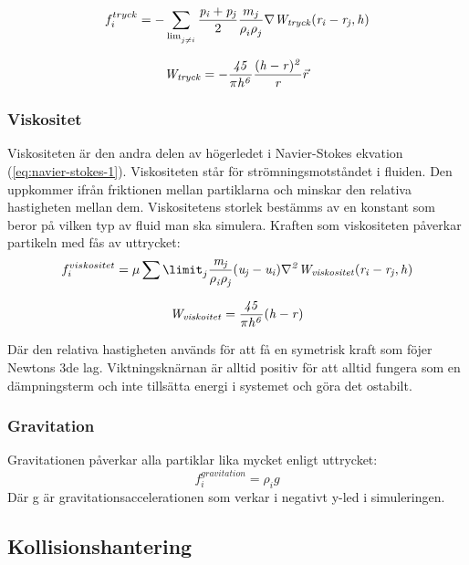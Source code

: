 \documentclass[a4paper,12pt,oneside,final]{extarticle}
\begin{document}
\begin{equation} \label{eq:f_tryck}
f^{tryck}_i = - \sum_{\lim^{}_{j \neq i}} \frac{\it p_i + p_j}{2} \frac{m_j}{\rho^{}_{i} \rho^{}_{j}} \nabla {\it W_{tryck} (r_i - r_j,h)}
\end{equation}

\begin{equation} \label{eq:w_tryck}
{\it W_{tryck} = -\frac{45}{\pi h^6}\frac{(h-r)^2}{r}} \vec{r}
\end{equation}

\subsubsection{Viskositet}
Viskositeten är den andra delen av högerledet i Navier-Stokes ekvation (\ref{eq:navier-stokes-1}).
Viskositeten står för strömningsmotståndet i fluiden.
Den uppkommer ifrån friktionen mellan partiklarna och minskar den relativa hastigheten mellan dem.
Viskositetens storlek bestämms av en konstant som beror på vilken typ av fluid man ska simulera.
Kraften som viskositeten påverkar partikeln med fås av uttrycket:
\begin{equation}
f^{viskositet}_i = \mu \sum \limit^{}_{j} {\it \frac{m_j}{\rho^{}_{i} \rho^{}_{j}} (u_j - u_i) \nabla^{2}_{} W_{viskositet} (r_i - r_j,h)}
\end{equation}

\begin{equation}
{\it W_{viskoitet} = \frac{45}{\pi h^6} {(h-r)}}
\end{equation}

Där den relativa hastigheten används för att få en symetrisk kraft som föjer Newtons 3de lag. Viktningsknärnan är alltid positiv för att alltid fungera som en dämpningsterm och inte tillsätta energi i systemet och göra det ostabilt. 

\subsubsection{Gravitation}
Gravitationen påverkar alla partiklar lika mycket enligt uttrycket:
\begin{equation}
f^{gravitation}_{i} = \rho^{}_{i}g
\end{equation}
Där g är gravitationsaccelerationen som verkar i negativt y-led i simuleringen.

\subsection{Kollisionshantering}
\end{document}
